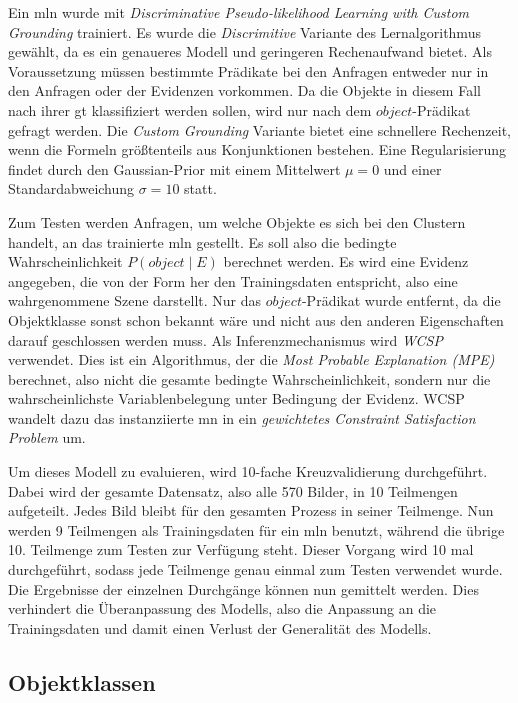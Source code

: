 Ein \gls{mln} wurde mit \textit{Discriminative Pseudo-likelihood Learning with Custom Grounding} trainiert. Es wurde die \textit{Discrimitive} Variante des Lernalgorithmus gewählt, da es ein genaueres Modell und geringeren Rechenaufwand bietet. Als Voraussetzung müssen bestimmte Prädikate bei den Anfragen entweder nur in den Anfragen oder der Evidenzen vorkommen. Da die Objekte in diesem Fall nach ihrer \gls{gt} klassifiziert werden sollen, wird nur nach dem $object$-Prädikat gefragt werden. Die \textit{Custom Grounding} Variante bietet eine schnellere Rechenzeit, wenn die Formeln größtenteils aus Konjunktionen bestehen. Eine Regularisierung findet durch den Gaussian-Prior mit einem Mittelwert $\mu = 0$ und einer Standardabweichung $\sigma = 10$ statt. \par   

Zum Testen werden Anfragen, um welche Objekte es sich bei den Clustern handelt, an das trainierte \gls{mln} gestellt. Es soll also die bedingte Wahrscheinlichkeit $P(object \mid E)$ berechnet werden. Es wird eine Evidenz angegeben, die von der Form her den Trainingsdaten entspricht, also eine wahrgenommene Szene darstellt. Nur das $object$-Prädikat wurde entfernt, da die Objektklasse sonst schon bekannt wäre und nicht aus den anderen Eigenschaften darauf geschlossen werden muss. Als Inferenzmechanismus wird \textit{WCSP} verwendet. Dies ist ein Algorithmus, der die \textit{Most Probable Explanation (MPE)} berechnet, also nicht die gesamte bedingte Wahrscheinlichkeit, sondern nur die wahrscheinlichste Variablenbelegung unter Bedingung der Evidenz. WCSP wandelt dazu das instanziierte \gls{mn} in ein \textit{gewichtetes Constraint Satisfaction Problem} um. \par

Um dieses Modell zu evaluieren, wird 10-fache Kreuzvalidierung durchgeführt. Dabei wird der gesamte Datensatz, also alle 570 Bilder, in 10 Teilmengen aufgeteilt. Jedes Bild bleibt für den gesamten Prozess in seiner Teilmenge. Nun werden 9 Teilmengen als Trainingsdaten für ein \gls{mln} benutzt, während die übrige 10. Teilmenge zum Testen zur Verfügung steht. Dieser Vorgang wird 10 mal durchgeführt, sodass jede Teilmenge genau einmal zum Testen verwendet wurde. Die Ergebnisse der einzelnen Durchgänge können nun gemittelt werden. Dies verhindert die Überanpassung des Modells, also die Anpassung an die Trainingsdaten und damit einen Verlust der Generalität des Modells. 

\subsection{Objektklassen}

